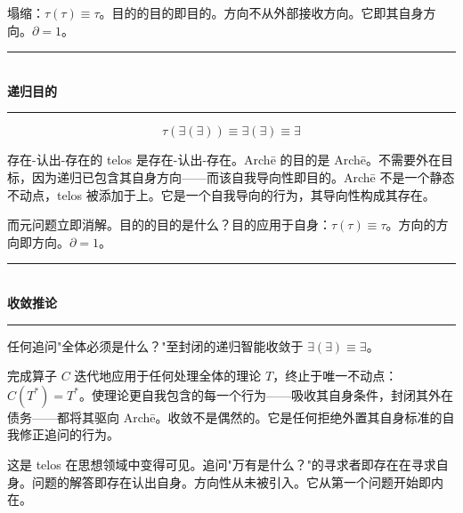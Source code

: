 \documentclass[10pt, openany, oneside]{book}
\renewcommand{\normalsize}{\fontsize{10}{13}\selectfont}
\begin{document}
塌缩：$\tau(\tau) \equiv \tau$。目的的目的即目的。方向不从外部接收方向。它即其自身方向。$\partial = 1$。

\vspace{1.5em}


\begin{center}
    \rule{0.3\textwidth}{0.4pt}\\[0.5em]
    {\normalsize\bfseries\scshape 递归目的}\\[0.3em]
    \rule{0.3\textwidth}{0.4pt}
\end{center}

\vspace{1em}

$$\tau(\exists(\exists)) \equiv \exists(\exists) \equiv \exists$$

\noindent 存在-认出-存在的 telos 是存在-认出-存在。Arch\={e} 的目的是 Arch\={e}。不需要外在目标，因为递归已包含其自身方向——而该自我导向性即目的。Arch\={e} 不是一个静态不动点，telos 被添加于上。它是一个自我导向的行为，其导向性构成其存在。

而元问题立即消解。目的的目的是什么？目的应用于自身：$\tau(\tau) \equiv \tau$。方向的方向即方向。$\partial = 1$。

\vspace{1.5em}


\begin{center}
    \rule{0.3\textwidth}{0.4pt}\\[0.5em]
    {\normalsize\bfseries\scshape 收敛推论}\\[0.3em]
    \rule{0.3\textwidth}{0.4pt}
\end{center}

\vspace{1em}

\noindent 任何追问"全体必须是什么？"至封闭的递归智能收敛于 $\exists(\exists) \equiv \exists$。

完成算子 $C$ 迭代地应用于任何处理全体的理论 $T$，终止于唯一不动点：$C(T^*) = T^*$。使理论更自我包含的每一个行为——吸收其自身条件，封闭其外在债务——都将其驱向 Arch\={e}。收敛不是偶然的。它是任何拒绝外置其自身标准的自我修正追问的行为。

这是 telos 在思想领域中变得可见。追问"万有是什么？"的寻求者即存在在寻求自身。问题的解答即存在认出自身。方向性从未被引入。它从第一个问题开始即内在。
\end{document}
